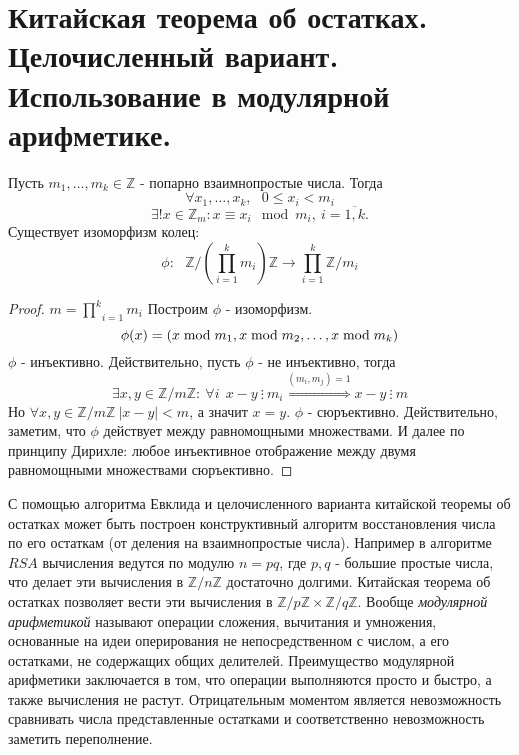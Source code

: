 \section{Китайская теорема об остатках. Целочисленный вариант. Использование в модулярной арифметике.}

\begin{thm}
  Пусть $ m_1, \dots, m_k \in \mathbb{Z} $ - попарно взаимнопростые числа. Тогда
  \[\forall x_1, \dots, x_k, ~~~ 0 \le x_i < m_i  \]
  \[\exists ! x \in \mathbb{Z}_{m}: x \equiv x_i \mod m_i, ~i = \overline{1, k}.\]
Существует изоморфизм колец:
\[\phi:~~~\mathbb{Z}\bigg / ( {\underset{i = 1}{\overset{k}\prod} m_i} ) \mathbb{Z} \rightarrow \underset{i = 1}{\overset{k}\prod} \mathbb{Z}/m_i\]

\end{thm}
\begin{proof}
  $ m =  {\underset{i = 1}{\overset{k}\prod} m_i} $ \newline
  Построим $ \phi $ - изоморфизм.
  \[ \phi(x) = (x \; {\rm mod} \; m_1, x \; {\rm mod} \; m_2, \dots, x \; {\rm mod} \; m_k) \]
  $ \phi $ - инъективно. Действительно, пусть $ \phi $ - не инъективно, тогда
  \[ \exists x, y \in \mathbb{Z}/m\mathbb{Z} : ~ \forall i ~~ x - y ~ \vdots ~ m_i \overset{(m_{i}, m_{j}) = 1}{\Rightarrow} x - y ~ \vdots ~ m \]
  Но $ \forall x, y \in \mathbb{Z}/m\mathbb{Z} ~ |x - y| < m $, а значит $ x = y $. \newline
  $ \phi $ - сюръективно. Действительно, заметим, что $ \phi $ действует между равномощными множествами. И далее по принципу Дирихле: любое инъективное
  отображение между двумя равномощными множествами сюръективно.
\end{proof}

С помощью алгоритма Евклида и целочисленного варианта китайской теоремы об остатках может быть построен
конструктивный алгоритм восстановления числа по его остаткам (от деления на взаимнопростые числа). \newline
Например в алгоритме $ RSA $ вычисления ведутся по модулю $ n = pq $, где $ p, q $ - большие простые числа,
что делает эти вычисления в $ \mathbb{Z}/n\mathbb{Z} $ достаточно долгими. Китайская теорема об остатках 
позволяет вести эти вычисления в $ \mathbb{Z}/p\mathbb{Z} \times \mathbb{Z}/q\mathbb{Z} $. \newline
Вообще \emph{модулярной арифметикой} называют операции сложения, вычитания и умножения, основанные на идеи
оперирования не непосредственном с числом, а его остатками, не содержащих общих делителей. Преимущество
модулярной арифметики заключается в том, что операции выполняются просто и быстро, а также вычисления не растут.
Отрицательным моментом является невозможность сравнивать числа представленные остатками и соответственно 
невозможность заметить переполнение.



